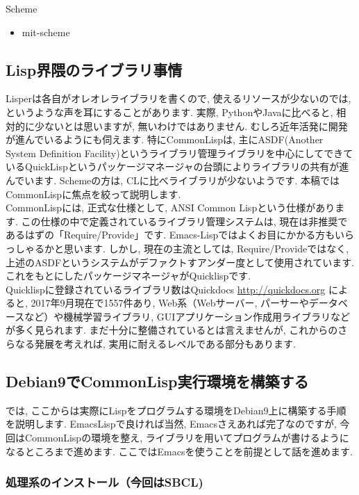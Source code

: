 \documentclass[mingoth,a4paper]{jsarticle}
\begin{document}
Scheme
\begin{itemize}
\item mit-scheme
\end{itemize}


\subsection{Lisp界隈のライブラリ事情}
 Lisperは各自がオレオレライブラリを書くので, 使えるリソースが少ないのでは, というような声を耳にすることがあります. 実際, PythonやJavaに比べると, 相対的に少ないとは思いますが, 無いわけではありません. むしろ近年活発に開発が進んでいるようにも伺えます. 特にCommonLispは, 主にASDF(Another System Definition Facility)というライブラリ管理ライブラリを中心にしてできているQuickLispというパッケージマネージャの台頭によりライブラリの共有が進んでいます. Schemeの方は, CLに比べライブラリが少ないようです. 本稿ではCommonLispに焦点を絞って説明します. \vspace{1em}\\
CommonLispには, 正式な仕様として, ANSI Common Lispという仕様があります. この仕様の中で定義されているライブラリ管理システムは, 現在は非推奨であるはずの「Require/Provide」です. Emacs-Lispではよくお目にかかる方もいらっしゃるかと思います. 
しかし, 現在の主流としては, Require/Provideではなく, 上述のASDFというシステムがデファクトすアンダー度として使用されています. これをもとにしたパッケージマネージャがQuicklispです. \vspace{1em}\\
Quicklispに登録されているライブラリ数はQuickdocs \url{http://quickdocs.org} によると, 2017年9月現在で1557件あり, Web系（Webサーバー, パーサーやデータベースなど）や機械学習ライブラリ, GUIアプリケーション作成用ライブラリなどが多く見られます. 
まだ十分に整備されているとは言えませんが, これからのさらなる発展を考えれば, 実用に耐えるレベルである部分もあります. 

\subsection{Debian9でCommonLisp実行環境を構築する}

では, ここからは実際にLispをプログラムする環境をDebian9上に構築する手順を説明します. EmacsLispで良ければ当然, Emacsさえあれば完了なのですが, 今回はCommonLispの環境を整え, ライブラリを用いてプログラムが書けるようになるところまで進めます. ここではEmacsを使うことを前提として話を進めます. 

\subsubsection{処理系のインストール（今回はSBCL)}
\end{document}
